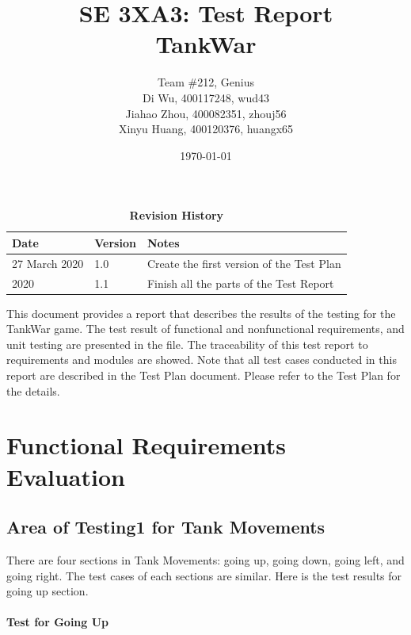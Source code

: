 \documentclass[12pt, titlepage]{article}
\title{SE 3XA3: Test Report\\TankWar}
\author{Team \#212, Genius
		\\Di Wu, 400117248, wud43 
		\\Jiahao Zhou, 400082351, zhouj56 
		\\Xinyu Huang, 400120376, huangx65
}
\date{\today}
\begin{document}
\maketitle

\tableofcontents
\listoftables
\listoffigures

\begin{table}[bp]
\caption{\bf Revision History}
\begin{tabularx}{\textwidth}{p{3cm}p{2cm}X}
\toprule {\bf Date} & {\bf Version} & {\bf Notes}\\
\midrule
27 March 2020 & 1.0 & Create the first version of the Test Plan\\
 2020 & 1.1 & Finish all the parts of the Test Report\\
\bottomrule
\end{tabularx}
\end{table}

\newpage


This document provides a report that describes the results of the testing for the TankWar game. The test result of functional and nonfunctional requirements, and unit testing are presented in the file. The traceability of this test report to requirements and modules are showed.
Note that all test cases conducted in this report are described in the Test Plan document. Please refer to the Test Plan for the details.

\section{Functional Requirements Evaluation}

\subsection{Area of Testing1 for Tank Movements}
There are four sections in Tank Movements: going up, going down, going left, and going right. The test cases of each sections are similar. Here is the test results for going up section.
\paragraph{Test for Going Up}
\end{document}
